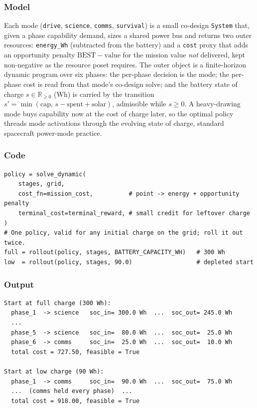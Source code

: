 \documentclass[11pt,a4paper]{article}
\newcommand{\Rplus}{\mathbb{R}_{\geq 0}}
\begin{document}
\subsubsection*{Model}
Each mode (\texttt{drive}, \texttt{science}, \texttt{comms},
\texttt{survival}) is a small co-design \texttt{System} that, given a
phase capability demand, sizes a shared power bus and returns two outer
resources: \texttt{energy\_Wh} (subtracted from the battery) and a
\texttt{cost} proxy that adds an opportunity penalty
$\mathrm{BEST}-\mathrm{value}$ for the mission value \emph{not} delivered,
kept non-negative as the resource poset requires. The outer object is a
finite-horizon dynamic program over six phases: the per-phase decision is
the mode; the per-phase cost is read from that mode's co-design solve; and
the battery state of charge $s\in\Rplus$ (Wh) is carried by the transition
$s'=\min(\text{cap},\,s-\text{spent}+\text{solar})$, admissible while
$s\ge 0$. A heavy-drawing mode buys capability now at the cost of charge
later, so the optimal policy threads mode activations through the evolving
state of charge, standard spacecraft power-mode practice.

\subsubsection*{Code}
\begin{lstlisting}
policy = solve_dynamic(
    stages, grid,
    cost_fn=mission_cost,          # point -> energy + opportunity penalty
    terminal_cost=terminal_reward, # small credit for leftover charge
)
# One policy, valid for any initial charge on the grid; roll it out twice.
full = rollout(policy, stages, BATTERY_CAPACITY_WH)   # 300 Wh
low  = rollout(policy, stages, 90.0)                  # depleted start
\end{lstlisting}

\subsubsection*{Output}
\begin{lstlisting}[language={},numbers=none,keywordstyle={}]
Start at full charge (300 Wh):
  phase_1  -> science   soc_in= 300.0 Wh  ...  soc_out= 245.0 Wh
  ...
  phase_5  -> science   soc_in=  80.0 Wh  ...  soc_out=  25.0 Wh
  phase_6  -> comms     soc_in=  25.0 Wh  ...  soc_out=  10.0 Wh
  total cost = 727.50, feasible = True

Start at low charge (90 Wh):
  phase_1  -> comms     soc_in=  90.0 Wh  ...  soc_out=  75.0 Wh
  ...  (comms held every phase)  ...
  total cost = 918.00, feasible = True
\end{lstlisting}
\end{document}
